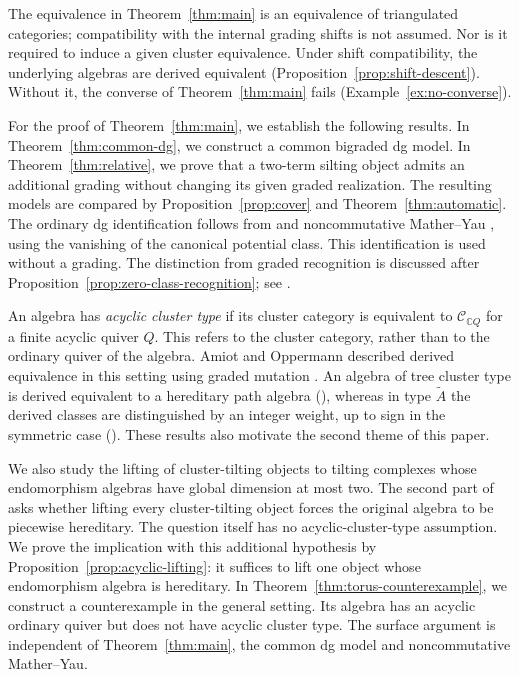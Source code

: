 \documentclass[12pt,a4paper,english,reqno]{amsart}
\theoremstyle{plain}
\theoremstyle{definition}
\numberwithin{equation}{section}
\newcommand{\thmref}[1]{Theorem~\ref{#1}}
\newcommand{\prpref}[1]{Proposition~\ref{#1}}
\def\calC{{\mathcal C}}
\def\bbC{{\mathbb C}}
\begin{document}
The equivalence in \thmref{thm:main} is an equivalence of triangulated categories; compatibility with the internal grading shifts is not assumed. Nor is it required to induce a given cluster equivalence. Under shift compatibility, the underlying algebras are derived equivalent (\prpref{prop:shift-descent}). Without it, the converse of \thmref{thm:main} fails (Example~\ref{ex:no-converse}).

For the proof of \thmref{thm:main}, we establish the following results. In \thmref{thm:common-dg}, we construct a common bigraded dg model. In \thmref{thm:relative}, we prove that a two-term silting object admits an additional grading without changing its given graded realization. The resulting models are compared by \prpref{prop:cover} and \thmref{thm:automatic}. The ordinary dg identification follows from \cite[Corollary~4.27]{HK} and noncommutative Mather--Yau \cite[Theorems~3.5 and~4.3]{HZ}, using the vanishing of the canonical potential class. This identification is used without a grading. The distinction from graded recognition is discussed after \prpref{prop:zero-class-recognition}; see \cite[Example~7.6]{HZFinite}.

An algebra has \emph{acyclic cluster type} if its cluster category is equivalent to $\calC_{\bbC Q}$ for a finite acyclic quiver $Q$. This refers to the cluster category, rather than to the ordinary quiver of the algebra. Amiot and Oppermann described derived equivalence in this setting using graded mutation \cite[Theorem~3.15]{AOTree}. An algebra of tree cluster type is derived equivalent to a hereditary path algebra (\cite[Corollary~3.16]{AOTree}), whereas in type $\widetilde A$ the derived classes are distinguished by an integer weight, up to sign in the symmetric case (\cite[Theorems~4.5 and~4.7]{AOTree}). These results also motivate the second theme of this paper.

We also study the lifting of cluster-tilting objects to tilting complexes whose endomorphism algebras have global dimension at most two. The second part of \cite[Question 6.23, p.~47]{AOTree} asks whether lifting every cluster-tilting object forces the original algebra to be piecewise hereditary. The question itself has no acyclic-cluster-type assumption. We prove the implication with this additional hypothesis by \prpref{prop:acyclic-lifting}: it suffices to lift one object whose endomorphism algebra is hereditary. In \thmref{thm:torus-counterexample}, we construct a counterexample in the general setting. Its algebra has an acyclic ordinary quiver but does not have acyclic cluster type. The surface argument is independent of \thmref{thm:main}, the common dg model and noncommutative Mather--Yau.
\end{document}
